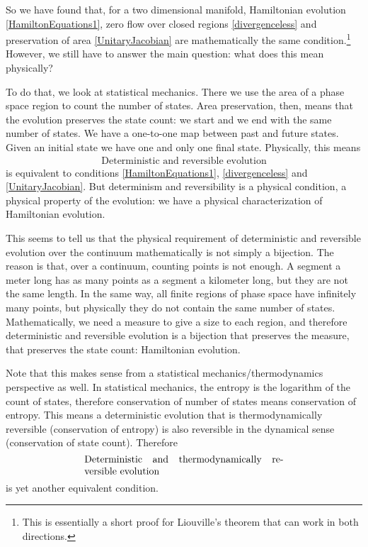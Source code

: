 \documentclass[10pt,twocolumn, nofootinbib]{revtex4-2}
\begin{document}
So we have found that, for a two dimensional manifold, Hamiltonian evolution \eqref{HamiltonEquations1}, zero flow over closed regions \eqref{divergenceless} and preservation of area \eqref{UnitaryJacobian} are mathematically the same condition.\footnote{This is essentially a short proof for Liouville's theorem that can work in both directions.} However, we still have to answer the main question: what does this mean physically?

To do that, we look at statistical mechanics. There we use the area of a phase space region to count the number of states. Area preservation, then, means that the evolution preserves the state count: we start and we end with the same number of states. We have a one-to-one map between past and future states. Given an initial state we have one and only one final state. Physically, this means
\begin{align}\label{DeterminismReversibility}
	\text{Deterministic and reversible evolution}
\end{align}
is equivalent to conditions \eqref{HamiltonEquations1}, \eqref{divergenceless} and \eqref{UnitaryJacobian}. But determinism and reversibility is a physical condition, a physical property of the evolution: we have a physical characterization of Hamiltonian evolution.

This seems to tell us that the physical requirement of deterministic and reversible evolution over the continuum mathematically is not simply a bijection. The reason is that, over a continuum, counting points is not enough. A segment a meter long has as many points as a segment a kilometer long, but they are not the same length. In the same way, all finite regions of phase space have infinitely many points, but physically they do not contain the same number of states. Mathematically, we need a measure to give a size to each region, and therefore deterministic and reversible evolution is a bijection that preserves the measure, that preserves the state count: Hamiltonian evolution.

Note that this makes sense from a statistical mechanics/thermodynamics perspective as well. In statistical mechanics, the entropy is the logarithm of the count of states, therefore conservation of number of states means conservation of entropy. This means a deterministic evolution that is thermodynamically reversible (conservation of entropy) is also reversible in the dynamical sense (conservation of state count). Therefore 
\begin{align}\label{DeterminismThermodynamicReversibility}
	\parbox{2.8in}{Deterministic and thermodynamically reversible evolution}
\end{align}
is yet another equivalent condition.
\end{document}
